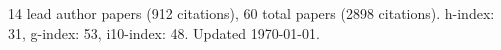 14 lead author papers (912 citations),
60 total papers (2898 citations).\newline
h-index: 31, g-index: 53, i10-index: 48. Updated \today.